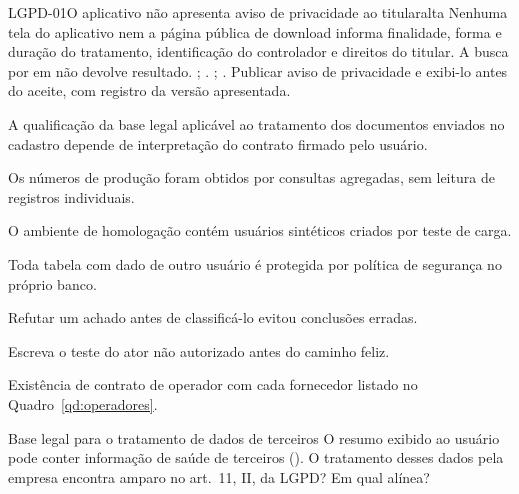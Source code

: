 \documentclass[11pt,a4paper,oneside]{report}
\begin{document}
\begin{achado}{LGPD-01}{O aplicativo não apresenta aviso de privacidade ao titular}{alta}
Nenhuma tela do aplicativo nem a página pública de download informa finalidade, forma e duração do tratamento, identificação do controlador e direitos do titular. A busca por  em  não devolve resultado.
; .
; .
Publicar aviso de privacidade e exibi-lo antes do aceite, com registro da versão apresentada.
\end{achado}

\begin{pontoparecer}
A qualificação da base legal aplicável ao tratamento dos documentos enviados no cadastro depende de interpretação do contrato firmado pelo usuário.
\end{pontoparecer}

\begin{nota}
Os números de produção foram obtidos por consultas agregadas, sem leitura de registros individuais.
\end{nota}

\begin{atencao}
O ambiente de homologação contém usuários sintéticos criados por teste de carga.
\end{atencao}

\begin{conforme}
Toda tabela com dado de outro usuário é protegida por política de segurança no próprio banco.
\end{conforme}

\begin{licao}
Refutar um achado antes de classificá-lo evitou conclusões erradas.
\end{licao}

\begin{pratica}
Escreva o teste do ator não autorizado antes do caminho feliz.
\end{pratica}

\begin{pendente}
Existência de contrato de operador com cada fornecedor listado no Quadro~\ref{qd:operadores}.
\end{pendente}

\begin{quesito}{Base legal para o tratamento de dados de terceiros}
O resumo exibido ao usuário pode conter informação de saúde de terceiros ().
O tratamento desses dados pela empresa encontra amparo no art.~11, II, da LGPD? Em qual alínea?
\end{quesito}
\end{document}
